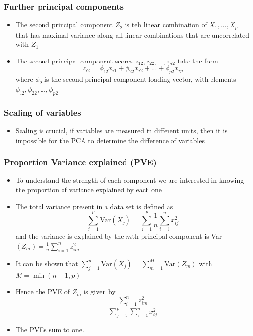 \documentclass{article}
\begin{document}
\subsubsection{Further principal components}
\begin{itemize}
    \item The second principal component $Z_2$ is teh linear combination of $X_1, ..., X_p$ that has maximal variance along all linear combinations that are uncorrelated with $Z_1$
    \item The second principal component scores $z_{12}, z_{22}, ..., z_{n2}$ take the form 
    \begin{equation*}
        z_{i2} = \phi_{12} x_{i1} + \phi_{22} x_{i2} + ... + \phi_{p2} x_{ip}
    \end{equation*}
    where $\phi_2$ is the second principal component loading vector, with elements $\phi_{12}, \phi_{22}, ..., \phi_{p2}$
\end{itemize}



\subsubsection{Scaling of variables}

\begin{itemize}
    \item Scaling is crucial, if variables are measured in different units, then it is impossible for the PCA to determine the difference of variables
\end{itemize}

\subsubsection{Proportion Variance explained (PVE)}

\begin{itemize}
    \item To understand the strength of each component we are interested in knowing the proportion of variance explained by each one
    \item The total variance present in a data set  is defined as
    \begin{equation*}
        \sum_{j=1}^p \text{Var}(X_j) = \sum_{j=1}^p \frac{1}{n} \sum_{i=1}^n x^2_{ij}
    \end{equation*}
    and the variance is explained by the $m$th principal component is Var$(Z_m) = \frac{1}{n} \sum_{i=1}^n z_{im}^2$
    \item It can be shown that $\sum_{j=1}^p \text{Var}(X_j) = \sum_{m=1}^M \text{Var}(Z_m)$ with $M = \min(n-1, p)$
    \item Hence the PVE of $Z_m$ is given by
    \begin{equation*}
        \frac{\sum_{i=1}^n z_{im}^2}{\sum_{j=1}^p\sum_{i=1}^n x_{ij}^2}
    \end{equation*}
    \item The PVEs sum to one.
\end{itemize}
\end{document}
